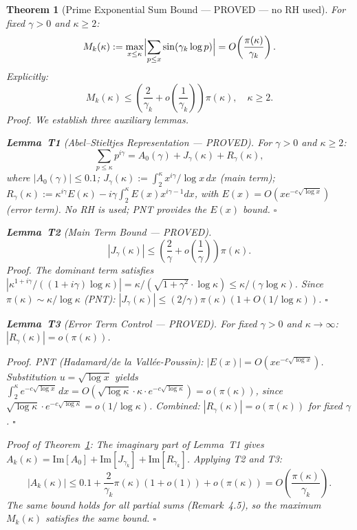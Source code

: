 \documentclass[11pt]{article}
\newtheorem{theorem}{Theorem}[section]
\begin{document}
\begin{theorem}[Prime Exponential Sum Bound --- PROVED --- no RH used]\label{thm:EXPLICIT}
For fixed $\gamma > 0$ and $\kappa\geq 2$:
\[
M_k(\kappa) := \max_{x\leq\kappa}\Bigl|\sum_{p\leq x}\sin(\gamma_k\log p)\Bigr|
= O\!\left(\frac{\pi(\kappa)}{\gamma_k}\right).
\]
Explicitly:
\[
M_k(\kappa) \leq \left(\frac{2}{\gamma_k} + o\!\left(\frac{1}{\gamma_k}\right)\right)\pi(\kappa),
\quad\kappa\geq 2.
\]
\emph{Proof.}
We establish three auxiliary lemmas.

\textbf{Lemma~T1} (Abel--Stieltjes Representation --- PROVED).
For $\gamma > 0$ and $\kappa\geq 2$:
\[
\sum_{p\leq\kappa}p^{i\gamma}
= A_0(\gamma) + J_\gamma(\kappa) + R_\gamma(\kappa),
\]
where $|A_0(\gamma)|\leq 0.1$;
$J_\gamma(\kappa) := \int_2^\kappa x^{i\gamma}/\log x\,dx$ (main term);
$R_\gamma(\kappa) := \kappa^{i\gamma}E(\kappa)
- i\gamma\int_2^\kappa E(x)x^{i\gamma-1}dx$,
with $E(x) = O(xe^{-c\sqrt{\log x}})$ (error term).
No RH is used; PNT provides the $E(x)$ bound. $\square$

\textbf{Lemma~T2} (Main Term Bound --- PROVED).
\[
|J_\gamma(\kappa)| \leq
\left(\frac{2}{\gamma} + o\!\left(\frac{1}{\gamma}\right)\right)\pi(\kappa).
\]
\emph{Proof.}
The dominant term satisfies
$|\kappa^{1+i\gamma}/((1+i\gamma)\log\kappa)|
= \kappa/(\sqrt{1+\gamma^2}\cdot\log\kappa) \leq \kappa/(\gamma\log\kappa)$.
Since $\pi(\kappa)\sim\kappa/\log\kappa$ (PNT):
$|J_\gamma(\kappa)|\leq(2/\gamma)\pi(\kappa)(1+O(1/\log\kappa))$. $\square$

\textbf{Lemma~T3} (Error Term Control --- PROVED).
For fixed $\gamma > 0$ and $\kappa\to\infty$:
$|R_\gamma(\kappa)| = o(\pi(\kappa))$.

\emph{Proof.}
PNT (Hadamard/de la Vall\'ee-Poussin):
$|E(x)| = O(xe^{-c\sqrt{\log x}})$.
Substitution $u = \sqrt{\log x}$ yields
$\int_2^\kappa e^{-c\sqrt{\log x}}\,dx
= O(\sqrt{\log\kappa}\cdot\kappa\cdot e^{-c\sqrt{\log\kappa}})
= o(\pi(\kappa))$,
since $\sqrt{\log\kappa}\cdot e^{-c\sqrt{\log\kappa}} = o(1/\log\kappa)$.
Combined: $|R_\gamma(\kappa)| = o(\pi(\kappa))$ for fixed $\gamma$. $\square$

\emph{Proof of Theorem~\ref{thm:EXPLICIT}:}
The imaginary part of Lemma~T1 gives
$A_k(\kappa) = \mathrm{Im}[A_0] + \mathrm{Im}[J_{\gamma_k}]
+ \mathrm{Im}[R_{\gamma_k}]$.
Applying T2 and T3:
\[
|A_k(\kappa)| \leq 0.1 + \frac{2}{\gamma_k}\pi(\kappa)(1+o(1)) + o(\pi(\kappa))
= O\!\left(\frac{\pi(\kappa)}{\gamma_k}\right).
\]
The same bound holds for all partial sums (Remark~4.5), so the maximum
$M_k(\kappa)$ satisfies the same bound. $\square$
\end{theorem}
\end{document}
